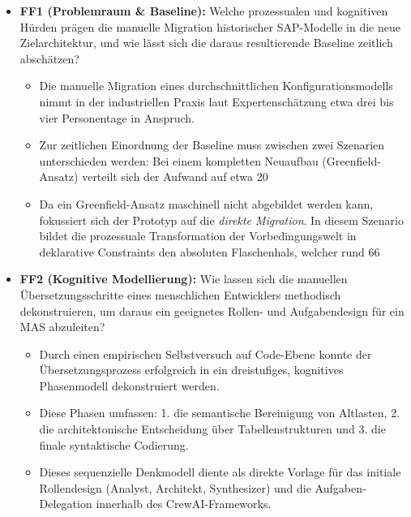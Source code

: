 \begin{itemize}
\item \textbf{\ac{FF}1 (Problemraum \& Baseline):} Welche prozessualen und kognitiven Hürden prägen die manuelle Migration historischer SAP-Modelle in die neue Zielarchitektur, und wie lässt sich die daraus resultierende Baseline zeitlich abschätzen?
\begin{itemize}
\item Die manuelle Migration eines durchschnittlichen Konfigurationsmodells nimmt in der industriellen Praxis laut Expertenschätzung etwa drei bis vier Personentage in Anspruch.
\item Zur zeitlichen Einordnung der Baseline muss zwischen zwei Szenarien unterschieden werden: Bei einem kompletten Neuaufbau (Greenfield-Ansatz) verteilt sich der Aufwand auf etwa 20%
\item Da ein Greenfield-Ansatz maschinell nicht abgebildet werden kann, fokussiert sich der Prototyp auf die \textit{direkte Migration}. In diesem Szenario bildet die prozessuale Transformation der Vorbedingungswelt in deklarative Constraints den absoluten Flaschenhals, welcher rund 66%
\end{itemize}

\item \textbf{\ac{FF}2 (Kognitive Modellierung):} Wie lassen sich die manuellen Übersetzungsschritte eines menschlichen Entwicklers methodisch dekonstruieren, um daraus ein geeignetes Rollen- und Aufgabendesign für ein \ac{MAS} abzuleiten?
\begin{itemize}
    \item Durch einen empirischen Selbstversuch auf Code-Ebene konnte der Übersetzungsprozess erfolgreich in ein dreistufiges, kognitives Phasenmodell dekonstruiert werden.
    \item Diese Phasen umfassen: 1. die semantische Bereinigung von Altlasten, 2. die architektonische Entscheidung über Tabellenstrukturen und 3. die finale syntaktische Codierung.
    \item Dieses sequenzielle Denkmodell diente als direkte Vorlage für das initiale Rollendesign (Analyst, Architekt, Synthesizer) und die Aufgaben-Delegation innerhalb des CrewAI-Frameworks.
\end{itemize}


\end{itemize}

